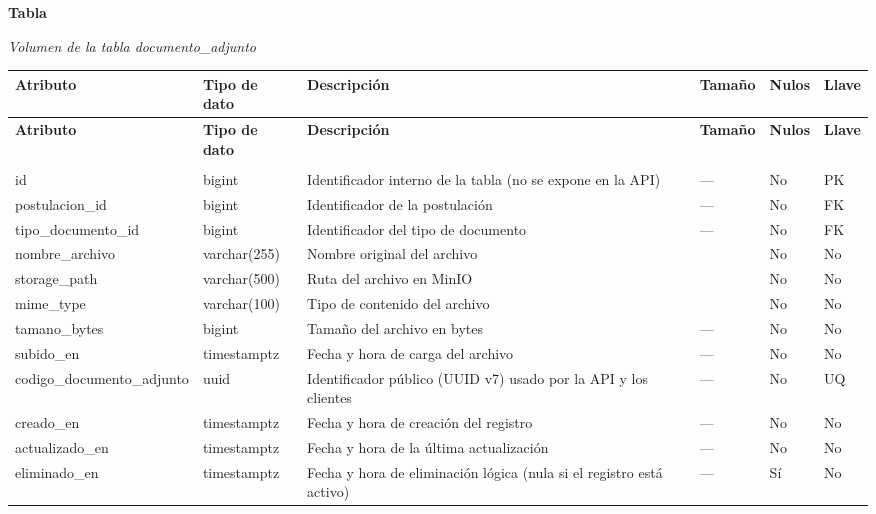 \label{tab:volumen_documento_adjunto}
\noindent\textbf{Tabla~\thetable}\par\nopagebreak
\noindent\textit{Volumen de la tabla documento\_\allowbreak{}adjunto}\par\nopagebreak
\begingroup\small\linespread{1}\selectfont\setlength{\tabcolsep}{4pt}
\begin{longtable}{>{\raggedright\arraybackslash}p{3.4cm} >{\raggedright\arraybackslash}p{2.5cm} >{\raggedright\arraybackslash}p{4.8cm} >{\centering\arraybackslash}p{1.6cm}>{\centering\arraybackslash}p{1.1cm} >{\centering\arraybackslash}p{1.3cm}}
\toprule
\textbf{Atributo} & \textbf{Tipo de dato} & \textbf{Descripción} & \textbf{Tamaño} & \textbf{Nulos} & \textbf{Llave} \\
\midrule
\endfirsthead
\toprule
\textbf{Atributo} & \textbf{Tipo de dato} & \textbf{Descripción} & \textbf{Tamaño} & \textbf{Nulos} & \textbf{Llave} \\
\midrule
\endhead
\endfoot
\bottomrule
\multicolumn{6}{l}{\textit{Nota.} Elaboración propia.} \\
\endlastfoot
id & bigint & Identificador interno de la tabla (no se expone en la API) & — & No & PK \\
postulacion\_\allowbreak{}id & bigint & Identificador de la postulación & — & No & FK \\
tipo\_\allowbreak{}documento\_\allowbreak{}id & bigint & Identificador del tipo de documento & — & No & FK \\
nombre\_\allowbreak{}archivo & varchar(255) & Nombre original del archivo & 255 & No & No \\
storage\_\allowbreak{}path & varchar(500) & Ruta del archivo en MinIO & 500 & No & No \\
mime\_\allowbreak{}type & varchar(100) & Tipo de contenido del archivo & 100 & No & No \\
tamano\_\allowbreak{}bytes & bigint & Tamaño del archivo en bytes & — & No & No \\
subido\_\allowbreak{}en & timestamptz & Fecha y hora de carga del archivo & — & No & No \\
codigo\_\allowbreak{}documento\_\allowbreak{}adjunto & uuid & Identificador público (UUID v7) usado por la API y los clientes & — & No & UQ \\
creado\_\allowbreak{}en & timestamptz & Fecha y hora de creación del registro & — & No & No \\
actualizado\_\allowbreak{}en & timestamptz & Fecha y hora de la última actualización & — & No & No \\
eliminado\_\allowbreak{}en & timestamptz & Fecha y hora de eliminación lógica (nula si el registro está activo) & — & Sí & No \\
\end{longtable}
\endgroup
\addtocounter{table}{-1}

